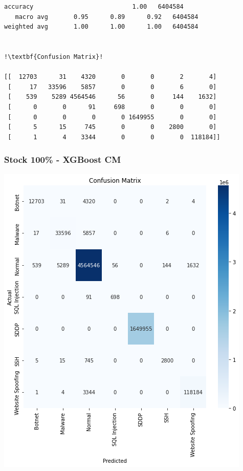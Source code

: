 \begin{appendices}
\begin{lstlisting}[escapechar=!]
    accuracy                           1.00   6404584
   macro avg       0.95      0.89      0.92   6404584
weighted avg       1.00      1.00      1.00   6404584
    
    
!\textbf{Confusion Matrix}!

[[  12703      31    4320       0       0       2       4]
 [     17   33596    5857       0       0       6       0]
 [    539    5289 4564546      56       0     144    1632]
 [      0       0      91     698       0       0       0]
 [      0       0       0       0 1649955       0       0]
 [      5      15     745       0       0    2800       0]
 [      1       4    3344       0       0       0  118184]]
\end{lstlisting}

\subsubsection{Stock 100\% - XGBoost CM}
\includegraphics[width=\textwidth]{Appendices/Images/XGB/xgb_stock_100_cm.png}



\end{appendices}
